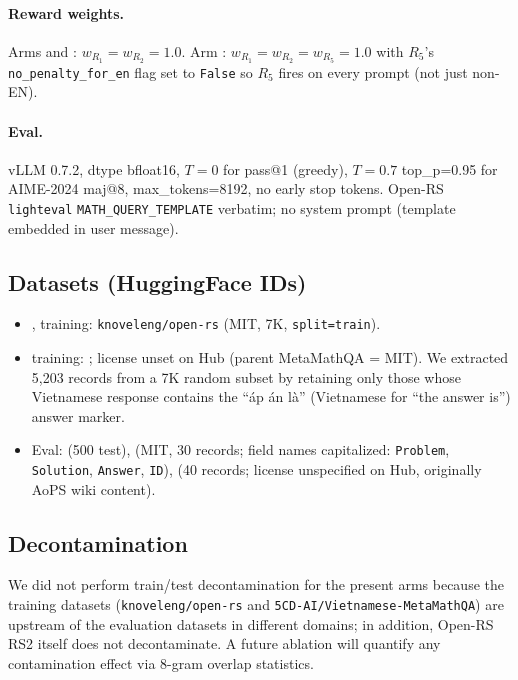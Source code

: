 \paragraph{Reward weights.} Arms \armA{} and \armB{}: $w_{R_1}{=}w_{R_2}{=}1.0$.
Arm \armC{}: $w_{R_1}{=}w_{R_2}{=}w_{R_5}{=}1.0$ with
$R_5$'s \texttt{no\_penalty\_for\_en} flag set to \texttt{False} so $R_5$ fires on
every prompt (not just non-EN).

\paragraph{Eval.} vLLM 0.7.2, dtype bfloat16, $T{=}0$ for pass@1 (greedy), $T{=}0.7$
top\_p=0.95 for AIME-2024 maj@8, max\_tokens=8192, no early stop tokens.
Open-RS \texttt{lighteval} \texttt{MATH\_QUERY\_TEMPLATE} verbatim; no system
prompt (template embedded in user message).

\subsection{Datasets (HuggingFace IDs)}
\begin{itemize}\itemsep0pt
\item \armA{}, \armC{} training: \texttt{knoveleng/open-rs} (MIT, 7K, \texttt{split=train}).
\item \armB{} training:
; license unset
on Hub (parent MetaMathQA = MIT). We extracted 5{,}203 records from a 7K random
subset by retaining only those whose Vietnamese response contains the
``\DJ\'ap \'an l\`a'' (Vietnamese for ``the answer is'') answer marker.
\item Eval:  (500 test), 
(MIT, 30 records; field names capitalized: \texttt{Problem}, \texttt{Solution},
\texttt{Answer}, \texttt{ID}),  (40 records; license
unspecified on Hub, originally AoPS wiki content).
\end{itemize}

\subsection{Decontamination}
We did not perform train/test decontamination for the present arms because the
training datasets (\texttt{knoveleng/open-rs} and \texttt{5CD-AI/Vietnamese-MetaMathQA})
are upstream of the evaluation datasets in different domains; in addition,
Open-RS RS2 itself does not decontaminate. A future ablation will quantify any
contamination effect via 8-gram overlap statistics.

